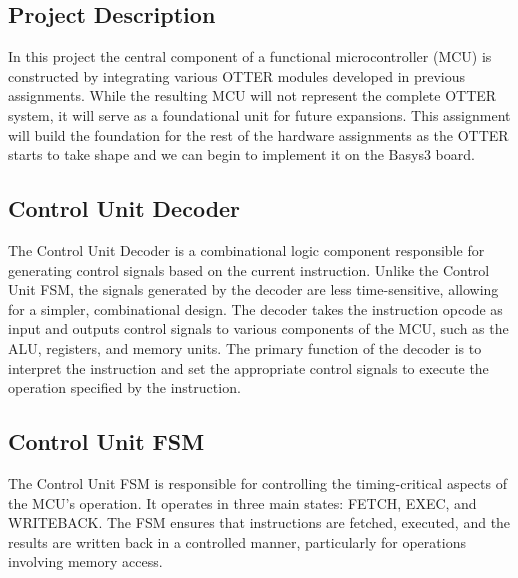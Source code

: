\documentclass[
    a4paper, %
	12pt, %
    ]{CSSullivanBusinessReport}
\begin{document}
\newpage
\begin{fullwidth} %

\section{Project Description} %

In this project the central component of a functional microcontroller (MCU) is constructed by integrating various OTTER modules developed in previous assignments. While the resulting MCU will not represent the complete OTTER system, it will serve as a foundational unit for future expansions. This assignment will build the foundation for the rest of the hardware assignments as the OTTER starts to take shape and we can begin to implement it on the Basys3 board.

\subsection{Control Unit Decoder}
The Control Unit Decoder is a combinational logic component responsible for generating control signals based on the current instruction. Unlike the Control Unit FSM, the signals generated by the decoder are less time-sensitive, allowing for a simpler, combinational design. The decoder takes the instruction opcode as input and outputs control signals to various components of the MCU, such as the ALU, registers, and memory units. The primary function of the decoder is to interpret the instruction and set the appropriate control signals to execute the operation specified by the instruction.

\subsection{Control Unit FSM}
The Control Unit FSM is responsible for controlling the timing-critical aspects of the MCU's operation. It operates in three main states: FETCH, EXEC, and WRITEBACK. The FSM ensures that instructions are fetched, executed, and the results are written back in a controlled manner, particularly for operations involving memory access.


\end{fullwidth}
\end{document}
